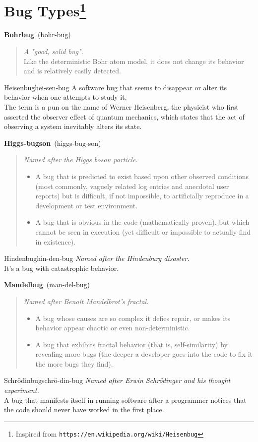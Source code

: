 \documentclass[10pt,a4paper,landscape]{article}
\newcommand{\entry}[4]{
    \textbf{#1}\ {(#2)}
    \begin{quote}
        {#3}
    \end{quote}
}
\begin{document}

\section*{Bug Types\footnote{Inspired from \texttt{https://en.wikipedia.org/wiki/Heisenbug}}}

\entry{Bohrbug}{bohr-bug}
{
    \emph{A "good, solid bug".} \\
    Like the deterministic Bohr atom model, it does not change its
    behavior and is relatively easily detected.
}

\entry{Heisenbug}{hei-sen-bug}
{
    A software bug that seems to disappear or alter its behavior when one
    attempts to study it. \\
    The term is a pun on the name of Werner Heisenberg, the physicist who
    first asserted the observer effect of quantum mechanics, which states
    that the act of observing a system inevitably alters its state.
}

\entry{Higgs-bugson}{higgs-bug-son}
{
    \emph{Named after the Higgs boson particle.}
    \begin{itemize}
        \item A bug that is predicted to exist based upon other observed
            conditions (most commonly, vaguely related log entries and
            anecdotal user reports) but is difficult, if not impossible, to
            artificially reproduce in a development or test environment.
        \item A bug that is obvious in the code (mathematically proven),
            but which cannot be seen in execution (yet difficult or
            impossible to actually find in existence).
    \end{itemize}
}

\entry{Hindenbug}{hin-den-bug}
{
    \emph{Named after the Hindenburg disaster.} \\
    It's a bug with catastrophic behavior.
}

\entry{Mandelbug}{man-del-bug}
{
    \emph{Named after Benoît Mandelbrot's fractal.}
    \begin{itemize}
        \item A bug whose causes are so complex it defies repair, or makes
            its behavior appear chaotic or even non-deterministic.
        \item A bug that exhibits fractal behavior (that is,
            self-similarity) by revealing more bugs (the deeper a developer
            goes into the code to fix it the more bugs they find).
    \end{itemize}
}

\entry{Schrödinbug}{schrö-din-bug}
{
    \emph{Named after Erwin Schrödinger and his thought experiment.} \\
    A bug that manifests itself in running software after a programmer
    notices that the code should never have worked in the first place.
}
\end{document}

